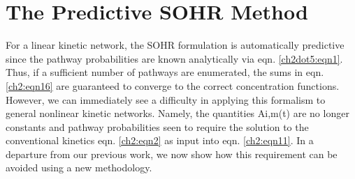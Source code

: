 \section{The Predictive SOHR Method}
For a linear kinetic network, the SOHR formulation is automatically predictive
since the pathway probabilities are known analytically via eqn. \ref{ch2dot5:eqn1}.
Thus, if a sufficient number of pathways are enumerated, the
sums in eqn. \ref{ch2:eqn16} are guaranteed to converge to the correct
concentration functions. However, we can immediately see a
difficulty in applying this formalism to general nonlinear kinetic
networks. Namely, the quantities Ai,m(t) are no longer constants
and pathway probabilities seen to require the solution to the
conventional kinetics eqn. \ref{ch2:eqn2} as input into eqn. \ref{ch2:eqn11}. In a departure
from our previous work, we now show how this requirement
can be avoided using a new methodology.
\newline
